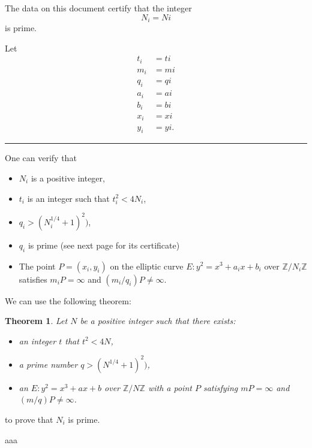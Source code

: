 \documentclass[12pt]{extarticle}
\newtheorem*{theorem*}{Theorem}
\begin{document}
\pagestyle{empty}
\phantom{a}
\vspace{2em}

\begin{center}
{\Huge {}}
\end{center}
\vspace{2em}

\noindent The data on this document certify that the integer
{\tiny
$$
N_i = {{ Ni }}
$$
}
is prime.

\vspace{2em}

\noindent Let
{\tiny
\begin{align*}
t_i &= {{ ti }} \\
m_i &= {{ mi }} \\
q_i &= {{ qi }} \\
a_i &= {{ ai }} \\
b_i &= {{ bi }} \\
x_i &= {{ xi }} \\
y_i &= {{ yi }}.
\end{align*}
}

\vspace{0.5em}
\hrule
\vspace{0.5em}

\begin{multicols}{3}
\noindent One can verify that
\begin{itemize}
\item $N_i$ is a positive integer,
\item $t_i$ is an integer such that $t_i^2 < 4N_i$,
\item $q_i > (N_i^{1/4} + 1)^2)$,
\item $q_i$ is prime (see next page for its certificate)
\item The point $P = (x_i, y_i)$ on the elliptic curve $E: y^2 = x^3 + a_ix + b_i$ over $\mathbb{Z}/{N_i}\mathbb{Z}$ satisfies $m_iP = \infty$ and $(m_i/q_i)P \neq \infty$.
\end{itemize}
\columnbreak
\noindent We can use the following theorem:
\begin{theorem*}
Let $N$ be a positive integer such that there exists:
\begin{itemize}
\item an integer $t$ that $t^2 < 4N$,
\item a prime number $q > (N^{1/4} + 1)^2)$,
\item an $E: y^2 = x^3 + ax + b$ over $\mathbb{Z}/{N}\mathbb{Z}$ with a point $P$ satisfying $mP = \infty$ and $(m/q)P \neq \infty$.
\end{itemize}
\end{theorem*}
\noindent to prove that $N_i$ is prime.

\columnbreak

aaa
\end{multicols}
\end{document}
